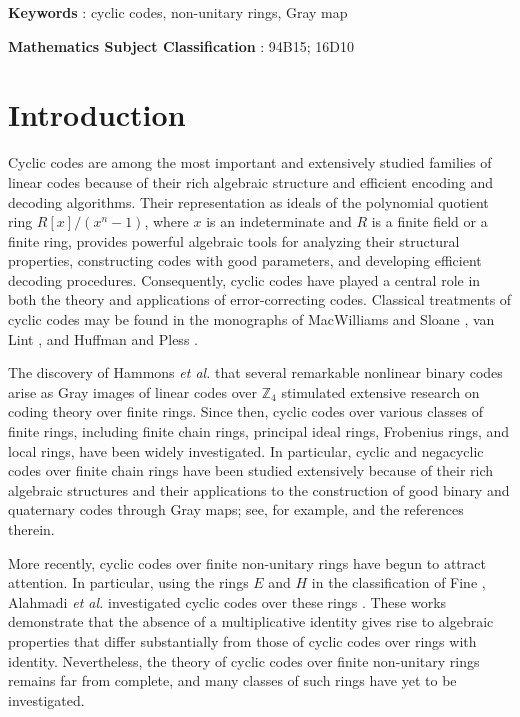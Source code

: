 \documentclass[12pt]{article}
\theoremstyle{definition}
\theoremstyle{plain}
\begin{document}
{\bf{Keywords}} : cyclic codes, non-unitary rings, Gray map


{\bf{Mathematics Subject Classification}} :   94B15; 16D10






\section{Introduction}

Cyclic codes are among the most important and extensively studied families of linear codes because of their rich algebraic structure and efficient encoding and decoding algorithms. Their representation as ideals of the polynomial quotient ring $R[x]/(x^n-1)$, where $x$ is an indeterminate and $R$ is a finite field or a finite ring, provides powerful algebraic tools for analyzing their structural properties, constructing codes with good parameters, and developing efficient decoding procedures. Consequently, cyclic codes have played a central role in both the theory and applications of error-correcting codes. Classical treatments of cyclic codes may be found in the monographs of MacWilliams and Sloane \cite{MacWilliamsSloane}, van Lint \cite{vanLint}, and Huffman and Pless \cite{HuffmanPless}.

The discovery of Hammons \textit{et al.} \cite{HammonsKerdPrepCodes} that several remarkable nonlinear binary codes arise as Gray images of linear codes over $\mathbb Z_4$ stimulated extensive research on coding theory over finite rings. Since then, cyclic codes over various classes of finite rings, including finite chain rings, principal ideal rings, Frobenius rings, and local rings, have been widely investigated. In particular, cyclic and negacyclic codes over finite chain rings have been studied extensively because of their rich algebraic structures and their applications to the construction of good binary and quaternary codes through Gray maps; see, for example, \cite{DinhLopezPermouth} and the references therein.

More recently, cyclic codes over finite non-unitary rings have begun to attract attention. In particular, using the rings $E$ and $H$ in the classification of Fine \cite{Fine}, Alahmadi \textit{et al.} investigated cyclic codes over these rings \cite{CyclicE2, CyclicH2}. These works demonstrate that the absence of a multiplicative identity gives rise to algebraic properties that differ substantially from those of cyclic codes over rings with identity. Nevertheless, the theory of cyclic codes over finite non-unitary rings remains far from complete, and many classes of such rings have yet to be investigated.
\end{document}
